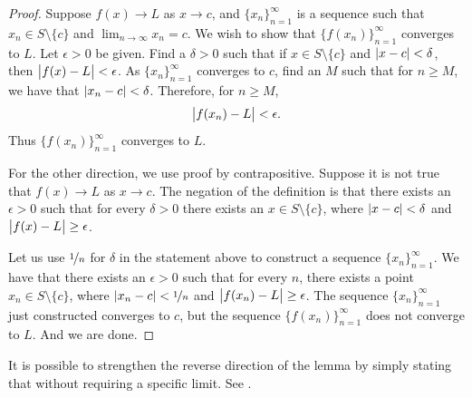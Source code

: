 \begin{proof}
Suppose 
$f(x) \to L$ as $x \to c$, and $\{ x_n \}_{n=1}^\infty$ is a sequence
such that
$x_n \in S \setminus \{c\}$ and
$\lim_{n\to\infty} x_n = c$.
We wish to show that $\bigl\{ f(x_n) \bigr\}_{n=1}^\infty$ converges to $L$.
Let $\epsilon > 0$ be given.  Find a $\delta > 0$ such that
if $x \in S \setminus \{c\}$ and $\lvert {x-c} \rvert < \delta$, then
$\bigl\lvert {f(x) - L} \bigr\rvert < \epsilon$.  As
$\{ x_n \}_{n=1}^\infty$  converges to $c$, find an $M$ such that for $n \geq M$,
we have that $\lvert {x_n - c} \rvert < \delta$.  Therefore, for $n \geq M$,
\begin{equation*}
\bigl\lvert {f(x_n) - L} \bigr\rvert < \epsilon .
\end{equation*}
Thus $\bigl\{ f(x_n) \bigr\}_{n=1}^\infty$ converges to $L$.

For the other direction, we use proof by contrapositive.  Suppose 
it is not true that $f(x) \to L$ as $x \to c$.  The negation of the
definition is that there exists an $\epsilon > 0$ such that for every
$\delta > 0$ there exists an $x \in S \setminus \{c\}$, where
$\lvert {x-c} \rvert < \delta$
and $\bigl\lvert {f(x)-L} \bigr\rvert \geq \epsilon$.

Let us use $\nicefrac{1}{n}$ for $\delta$ in the statement above to
construct a sequence $\{ x_n \}_{n=1}^\infty$.  We have
that there exists an $\epsilon > 0$ such that for every $n$,
there exists a point $x_n \in S \setminus \{c\}$, where
$\lvert {x_n-c} \rvert < \nicefrac{1}{n}$
and $\bigl\lvert {f(x_n)-L} \bigr\rvert \geq \epsilon$.
The sequence $\{ x_n \}_{n=1}^\infty$ just constructed converges to $c$, but
the sequence $\bigl\{ f(x_n) \bigr\}_{n=1}^\infty$ does not converge to $L$.
And we are done.
\end{proof}

It is possible to strengthen the reverse direction of
the lemma by simply stating that
 without requiring a specific limit.
See .

